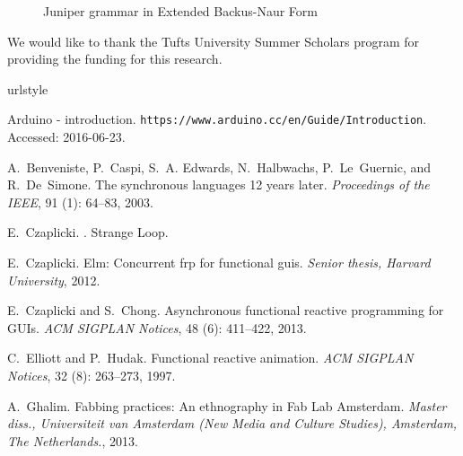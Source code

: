 \documentclass{sigplanconf}
\begin{document}
\begin{figure}[h]
\caption{Juniper grammar in Extended Backus-Naur Form}
\label{grammar}
\end{figure}

\acks

We would like to thank the Tufts University Summer Scholars program for providing the funding for this research.





\begin{thebibliography}{14}
\providecommand{\natexlab}[1]{#1}
\providecommand{\url}[1]{\texttt{#1}}
\expandafter\ifx\csname urlstyle\endcsname\relax
  \providecommand{\doi}[1]{doi: #1}\else
  \providecommand{\doi}{doi: \begingroup \urlstyle{rm}\Url}\fi

Arduino - introduction.
\newblock \url{https://www.arduino.cc/en/Guide/Introduction}.
\newblock Accessed: 2016-06-23.

A.~Benveniste, P.~Caspi, S.~A. Edwards, N.~Halbwachs, P.~Le~Guernic, and
  R.~De~Simone.
\newblock The synchronous languages 12 years later.
\newblock \emph{Proceedings of the IEEE}, 91 (1): 64--83,
  2003.

E.~Czaplicki.
.
\newblock Strange Loop.

E.~Czaplicki.
\newblock Elm: Concurrent frp for functional guis.
\newblock \emph{Senior thesis, Harvard University}, 2012.

E.~Czaplicki and S.~Chong.
\newblock Asynchronous functional reactive programming for {GUIs}.
\newblock \emph{ACM SIGPLAN Notices}, 48 (6): 411--422, 2013.

C.~Elliott and P.~Hudak.
\newblock Functional reactive animation.
\newblock \emph{ACM SIGPLAN Notices}, 32 (8): 263--273, 1997.

A.~Ghalim.
\newblock Fabbing practices: An ethnography in {Fab Lab Amsterdam}.
\newblock \emph{Master diss., Universiteit van Amsterdam (New Media and Culture
  Studies), Amsterdam, The Netherlands.}, 2013.


\end{thebibliography}
\end{document}
